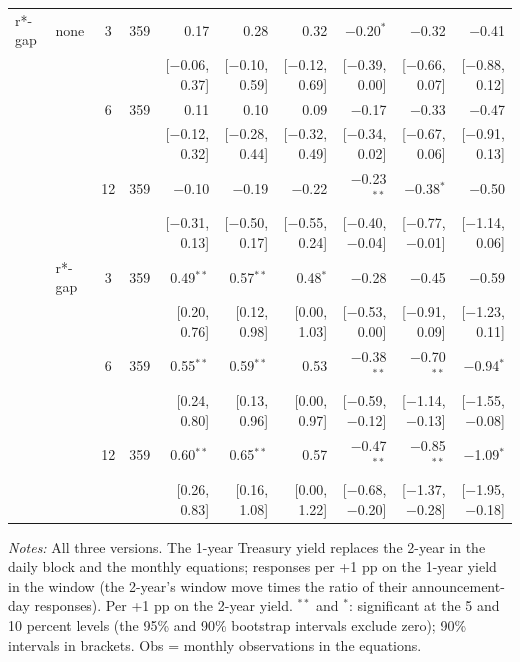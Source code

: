 \begin{longtable}{llcrrrrrrr}
\addlinespace
r*-gap & none & 3 & 359 & 0.17 & 0.28 & 0.32 & $-$0.20$^{*}$ & $-$0.32 & $-$0.41\\
 & & & & {\scriptsize [$-$0.06, 0.37]} & {\scriptsize [$-$0.10, 0.59]} & {\scriptsize [$-$0.12, 0.69]} & {\scriptsize [$-$0.39, 0.00]} & {\scriptsize [$-$0.66, 0.07]} & {\scriptsize [$-$0.88, 0.12]}\\
 &  & 6 & 359 & 0.11 & 0.10 & 0.09 & $-$0.17 & $-$0.33 & $-$0.47\\
 & & & & {\scriptsize [$-$0.12, 0.32]} & {\scriptsize [$-$0.28, 0.44]} & {\scriptsize [$-$0.32, 0.49]} & {\scriptsize [$-$0.34, 0.02]} & {\scriptsize [$-$0.67, 0.06]} & {\scriptsize [$-$0.91, 0.13]}\\
 &  & 12 & 359 & $-$0.10 & $-$0.19 & $-$0.22 & $-$0.23$^{**}$ & $-$0.38$^{*}$ & $-$0.50\\
 & & & & {\scriptsize [$-$0.31, 0.13]} & {\scriptsize [$-$0.50, 0.17]} & {\scriptsize [$-$0.55, 0.24]} & {\scriptsize [$-$0.40, $-$0.04]} & {\scriptsize [$-$0.77, $-$0.01]} & {\scriptsize [$-$1.14, 0.06]}\\
 & r*-gap & 3 & 359 & 0.49$^{**}$ & 0.57$^{**}$ & 0.48$^{*}$ & $-$0.28 & $-$0.45 & $-$0.59\\
 & & & & {\scriptsize [0.20, 0.76]} & {\scriptsize [0.12, 0.98]} & {\scriptsize [0.00, 1.03]} & {\scriptsize [$-$0.53, 0.00]} & {\scriptsize [$-$0.91, 0.09]} & {\scriptsize [$-$1.23, 0.11]}\\
 &  & 6 & 359 & 0.55$^{**}$ & 0.59$^{**}$ & 0.53 & $-$0.38$^{**}$ & $-$0.70$^{**}$ & $-$0.94$^{*}$\\
 & & & & {\scriptsize [0.24, 0.80]} & {\scriptsize [0.13, 0.96]} & {\scriptsize [0.00, 0.97]} & {\scriptsize [$-$0.59, $-$0.12]} & {\scriptsize [$-$1.14, $-$0.13]} & {\scriptsize [$-$1.55, $-$0.08]}\\
 &  & 12 & 359 & 0.60$^{**}$ & 0.65$^{**}$ & 0.57 & $-$0.47$^{**}$ & $-$0.85$^{**}$ & $-$1.09$^{*}$\\
 & & & & {\scriptsize [0.26, 0.83]} & {\scriptsize [0.16, 1.08]} & {\scriptsize [0.00, 1.22]} & {\scriptsize [$-$0.68, $-$0.20]} & {\scriptsize [$-$1.37, $-$0.28]} & {\scriptsize [$-$1.95, $-$0.18]}\\
\end{longtable}
\begin{flushleft}\footnotesize\textit{Notes:} All three versions. The 1-year Treasury yield replaces the 2-year in the daily block and the monthly equations; responses per +1 pp on the 1-year yield in the window (the 2-year's window move times the ratio of their announcement-day responses). Per +1 pp on the 2-year yield. $^{**}$ and $^{*}$: significant at the 5 and 10 percent levels (the 95\% and 90\% bootstrap intervals exclude zero); 90\% intervals in brackets. Obs = monthly observations in the equations.\end{flushleft}
\endgroup
